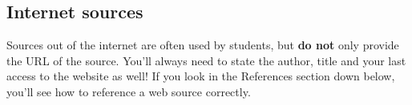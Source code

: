 \documentclass[]{article}
\begin{document}
\subsection{Internet sources}
Sources out of the internet are often used by students, but \textbf{do not} only provide the URL of the source. You'll always need to state the author, title and your last access to the website as well! If you look in the References section down below, you'll see how to reference a web source correctly. 


\printbibliography
\end{document}
